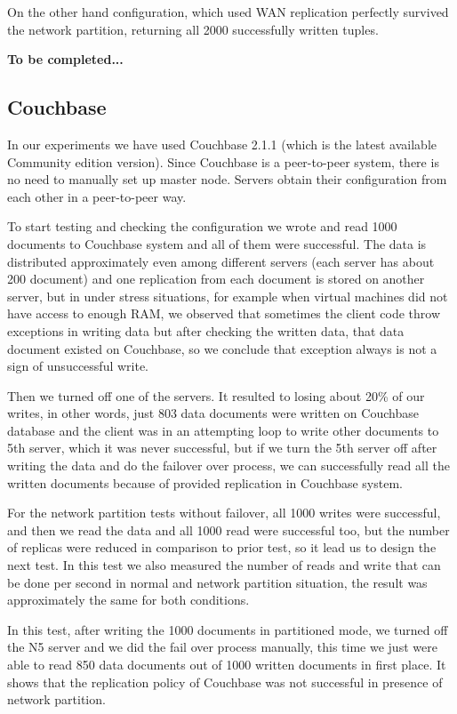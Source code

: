 \documentclass[a4paper]{article}
\begin{document}
On the other hand configuration, which used WAN replication perfectly survived the network partition, returning all 2000 successfully written tuples.

{\bf To be completed...}

\subsection{Couchbase}

In our experiments we have used Couchbase 2.1.1 (which is the latest available Community edition version). Since Couchbase is a peer-to-peer system, there is no need to manually set up master node. Servers obtain their configuration from each other in a peer-to-peer way.

To start testing and checking the configuration we wrote and read 1000 documents to Couchbase system and all of them were successful. 
The data is distributed approximately even among different servers (each server has about 200 document) and one replication from each document is stored on another server, but in under stress situations, for example when virtual machines did not have access to enough RAM, we observed that sometimes the client code throw exceptions in writing data but after checking the written data, that data document existed on Couchbase, so we conclude that exception always is not a sign of unsuccessful write.  


Then we turned off one of the servers. It resulted to losing about 20\% of our writes, in other words, just 803 data documents were written on Couchbase database and the client was in an attempting loop to write other documents to 5th server, which it was never successful, but if we turn the 5th server off after writing the data and do the failover over process, we can successfully read all the written documents because of provided replication in Couchbase system.


For the network partition tests without failover, all 1000 writes were successful, and then we read the data and all 1000 read were successful too, but the number of replicas were reduced in comparison to prior test, so it lead us to design the next test. In this test we also measured the number of reads and write that can be done per second in normal and network partition situation, the result was approximately the same for both conditions.


In this test, after writing the 1000 documents in partitioned mode, we turned off the N5 server and we did the fail over process manually, this time we just were able to read 850 data documents out of 1000 written documents in first place. It shows that the replication policy of Couchbase was not successful in presence of network partition.
\end{document}
